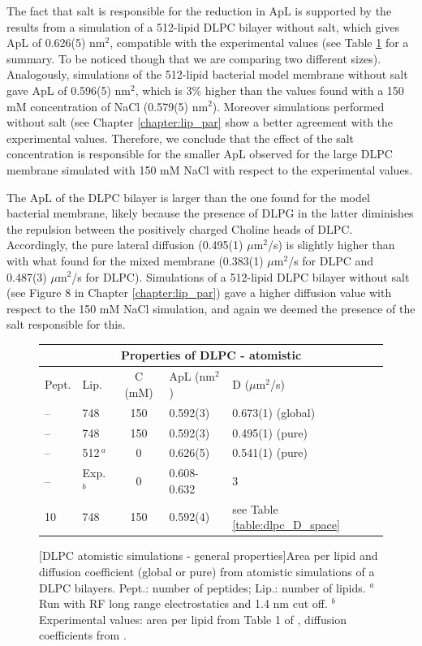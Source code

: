 The fact that salt is responsible for the reduction in ApL is supported by the results from a simulation of a 512-lipid DLPC bilayer without salt, which gives ApL of 0.626(5) nm$^2$, compatible with the experimental values (see Table \ref{table:dlpc_apl} for a summary. To be noticed though that we are comparing two different sizes). Analogously, simulations of the 512-lipid bacterial model membrane without salt gave ApL of 0.596(5) nm$^2$, which is 3\% higher than the values found with a 150 mM concentration of NaCl (0.579(5) nm$^2$).
%
Moreover simulations performed without salt (see Chapter \ref{chapter:lip_par} show a better agreement with the experimental values.
%
Therefore, we conclude that the effect of the salt concentration is responsible for the smaller ApL observed for the large DLPC membrane simulated with 150 mM NaCl with respect to the experimental values. 

The ApL of the DLPC bilayer is larger than the one found for the model bacterial membrane, likely because the presence of DLPG in the latter diminishes the repulsion between the positively charged Choline heads of DLPC. Accordingly, the pure lateral diffusion (0.495(1) $\mu$m$^2$/s) is slightly higher than with what found for the mixed membrane (0.383(1) $\mu$m$^2$/s for DLPC and 0.487(3) $\mu$m$^2$/s for DLPC). Simulations of a 512-lipid DLPC bilayer without salt (see Figure 8 in Chapter \ref{chapter:lip_par}) gave a higher diffusion value with respect to the 150 mM NaCl simulation, and again we deemed the presence of the salt responsible for this.

\begin{figure}[t!]
\centering
 \def\arraystretch{1.6}
\begin{tabular}{llcll}
\multicolumn{5}{c}{\textbf{Properties of DLPC - atomistic}} \\
\hline
Pept. & Lip. & C (mM) & ApL (nm$^2$) & D ($\mu$m$^2$/s) \\
\hline
-- & 748 & 150 & 0.592(3) & 0.673(1) (global) \\
-- & 748 & 150 & 0.592(3) & 0.495(1) (pure) \\
-- & 512$\,^a$ & 0 & 0.626(5) & 0.541(1) (pure) \\
\cline{2-5}
-- & Exp.$^b$ & 0 & 0.608-0.632 & 3 \\
\hline
10 & 748 & 150 & 0.592(4) & see Table \ref{table:dlpc_D_space} \\
\hline
 \end{tabular}
[DLPC atomistic simulations - general properties]{Area per lipid and diffusion coefficient (global or pure) from atomistic simulations of a DLPC bilayers. Pept.: number of peptides; Lip.: number of lipids. $^a$ Run with RF long range electrostatics and 1.4 nm cut off. $^b$ Experimental values: area per lipid from Table 1 of \citet{Poger2016}, diffusion coefficients from \citet{Lindblom2009}.}
\label{table:dlpc_apl}
\end{figure}

